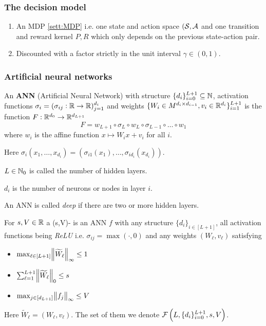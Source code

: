 

\subsubsection{The decision model}

\begin{sett}[Fan et al.]
  \begin{enumerate}
    \item An MDP \cref{sett:MDP} i.e. one state and action space
      $(\mathcal{S}, \mathcal{A}$ and one transition and reward kernel $P, R$
      which only depends on the previous state-action pair.
    \item Discounted with a factor strictly in the unit interval
      $\gamma \in (0,1)$.
  \end{enumerate}
\end{sett}

\subsubsection{Artificial neural networks}

\begin{defn}\label{def_ANN}
	An \textbf{ANN} (Artificial Neural Network) with structure
	$\{ d_i \}_{i=0}^{L+1} \subseteq \mathbb{N}$,
	activation functions $\sigma_i = (\sigma_{ij} : \mathbb{R} \to \mathbb{R})_{j=1}^{d_i}$
	and weights $\{ W_i \in M^{d_i \times d_{i-1}}, v_i \in \mathbb{R}^{d_i} \}_{i=1}^{L+1}$
	is the function $F:\mathbb{R}^{d_0} \to \mathbb{R}^{d_{L+1}}$ 
	\[ F = w_{L+1} \circ \sigma_L \circ w_L \circ \sigma_{L-1} \circ \dots \circ w_1 \]
	where $w_i$ is the affine function $x \mapsto W_i x + v_i$ for all $i$.

	Here $\sigma_i(x_1, \dots, x_{d_i})
	= (\sigma_{i1}(x_1), \dots, \sigma_{id_{i}}(x_{d_{i}}))$.

	$L \in \mathbb{N}_0$ is called the number of hidden layers.

	$d_i$ is the number of neurons or nodes in layer $i$.
\end{defn}

An ANN is called \emph{deep} if there are two or more hidden layers.

\begin{defn}
  For $s,V \in \mathbb{R}$ a (s,V)- is an ANN $f$
  with any structure $\{d_i\}_{i\in [L+1]}$,
  all activation functions being \emph{ReLU} i.e. $\sigma_{ij} = \max(\cdot, 0)$
  and any weights $(W_\ell, v_\ell)$
  satisfying
  \begin{multicols}{3}
    \begin{itemize}
      \item $\max_{\ell \in [L+1]} \norm{\widetilde{W}_\ell}_\infty \leq 1$
      \item $\sum_{\ell = 1}^{L+1} \norm{\widetilde{W}_\ell}_0 \leq s$
      \item $\max_{j \in [d_{L+1}]} \norm{f_j}_\infty \leq V$
    \end{itemize}
  \end{multicols}
  Here $\widetilde{W}_\ell = (W_\ell, v_\ell)$.
  The set of them we denote $\mathcal{F}\left(L, \{d_i\}_{i=0}^{L+1},s,V \right)$.
  \label{def:sparseReLU}
\end{defn}

